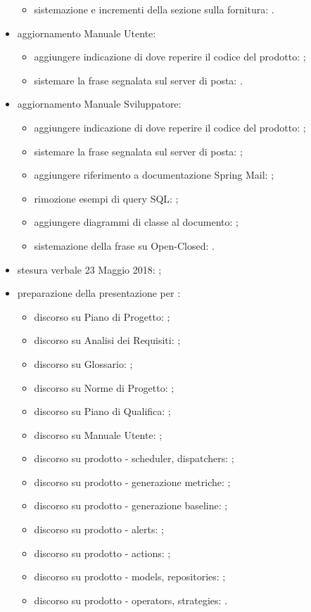 \begin{itemize}
\begin{itemize}
		\item sistemazione e incrementi della sezione sulla fornitura: \Carlo{}.
	\end{itemize}
	\item aggiornamento Manuale Utente:
	\begin{itemize}
		\item aggiungere indicazione di dove reperire il codice del prodotto: \Carlo{};
		\item sistemare la frase segnalata sul server di posta: \Carlo{}.
	\end{itemize}
	\item aggiornamento Manuale Sviluppatore:
	\begin{itemize}
		\item aggiungere indicazione di dove reperire il codice del prodotto: \Luca{};
		\item sistemare la frase segnalata sul server di posta: \Luca{};
		\item aggiungere riferimento a documentazione Spring Mail: \Luca{};
		\item rimozione esempi di query SQL: \Luca{};
		\item aggiungere diagrammi di classe al documento: \Luca{};
		\item sistemazione della frase su Open-Closed: \Luca{}.
	\end{itemize}
	\item stesura verbale 23 Maggio 2018: \Tommaso{};
	\item preparazione della presentazione per \Proponente{}:
	\begin{itemize}
		\item discorso su Piano di Progetto: \Tommaso{};
		\item discorso su Analisi dei Requisiti: \Mattia{};
		\item discorso su Glossario: \Isacco{};
		\item discorso su Norme di Progetto: \Cristian{};
		\item discorso su Piano di Qualifica: \Luca{};
		\item discorso su Manuale Utente: \Carlo{};
		\item discorso su prodotto - scheduler, dispatchers: \Leonardo{};
		\item discorso su prodotto - generazione metriche: \Tommaso{};
		\item discorso su prodotto - generazione baseline: \Mattia{};
		\item discorso su prodotto - alerts: \Isacco{};
		\item discorso su prodotto - actions: \Cristian{};
		\item discorso su prodotto - models, repositories: \Luca{};
		\item discorso su prodotto - operators, strategies: \Carlo.
	\end{itemize}
\end{itemize}

